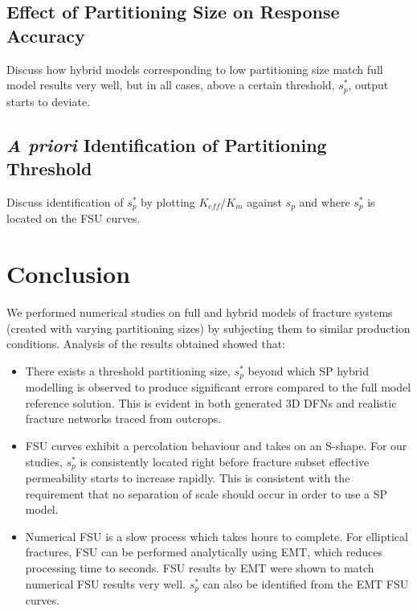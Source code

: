 \documentclass[a4paper]{article}
\begin{document}
\subsection{Effect of Partitioning Size on Response Accuracy}
Discuss how hybrid models corresponding to low partitioning size match full model results very well, but in all cases, above a certain threshold, $s_p^*$, output starts to deviate.

\subsection{\textit{A priori} Identification of Partitioning Threshold}
Discuss identification of $s_p^*$ by plotting $K_{eff}/K_m$ against $s_p$ and where $s_p^*$ is located on the FSU curves.

\section{Conclusion}
We performed numerical studies on full and hybrid models of fracture systems (created with varying partitioning sizes) by subjecting them to similar production conditions. Analysis of the results obtained showed that:

\begin{itemize}
    \item There exists a threshold partitioning size, $s_p^*$ beyond which SP hybrid modelling is observed to produce significant errors compared to the full model reference solution. This is evident in both generated 3D DFNs and realistic fracture networks traced from outcrops.
    
    \item FSU curves exhibit a percolation behaviour and takes on an S-shape. For our studies, $s_p^*$ is consistently located right before fracture subset effective permeability starts to increase rapidly. This is consistent with the requirement that no separation of scale should occur in order to use a SP model.
    
    \item Numerical FSU is a slow process which takes hours to complete. For elliptical fractures, FSU can be performed analytically using EMT, which reduces processing time to seconds. FSU results by EMT were shown to match numerical FSU results very well. $s_p^*$ can also be identified from the EMT FSU curves. 
    
\end{itemize}



\end{document}
